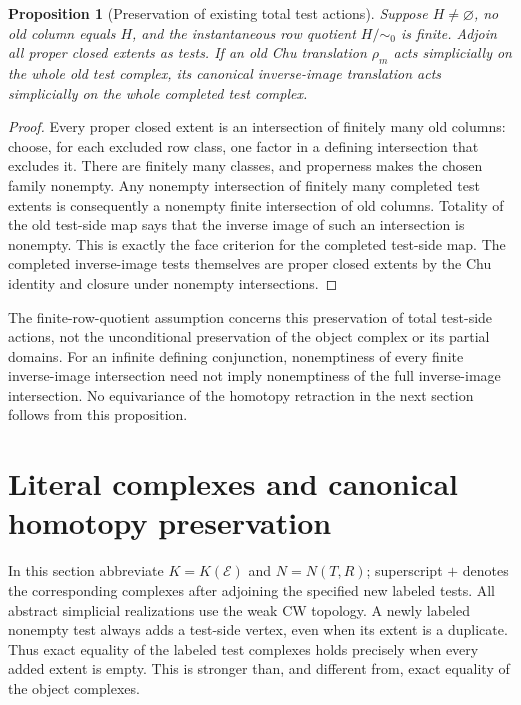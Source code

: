 \documentclass[11pt]{article}
\newtheorem{proposition}[theorem]{Proposition}
\theoremstyle{definition}
\begin{document}
\begin{proposition}[Preservation of existing total test actions]
Suppose $H\ne\varnothing$, no old column equals $H$, and the
instantaneous row quotient $H/{\sim_0}$ is finite. Adjoin all proper
closed extents as tests. If an old Chu translation $\rho_m$ acts
simplicially on the whole old test complex, its canonical inverse-image
translation acts simplicially on the whole completed test complex.
\end{proposition}
\begin{proof}
Every proper closed extent is an intersection of finitely many old
columns: choose, for each excluded row class, one factor in a defining
intersection that excludes it. There are finitely many classes, and
properness makes the chosen family nonempty. Any nonempty intersection
of finitely many completed test extents is consequently a nonempty
finite intersection of old columns. Totality of the old test-side map
says that the inverse image of such an intersection is nonempty. This
is exactly the face criterion for the completed test-side map.
The completed inverse-image tests themselves are proper closed extents
by the Chu identity and closure under nonempty intersections.
\end{proof}

The finite-row-quotient assumption concerns this preservation of total
test-side actions, not the unconditional preservation of the object
complex or its partial domains. For an infinite defining conjunction,
nonemptiness of every finite inverse-image intersection need not imply
nonemptiness of the full inverse-image intersection. No equivariance of
the homotopy retraction in the next section follows from this proposition.


\section{Literal complexes and canonical homotopy preservation}

In this section abbreviate $K=K(\mathcal E)$ and $N=N(T,R)$;
superscript $+$ denotes the corresponding complexes after adjoining the
specified new labeled tests. All abstract simplicial realizations use the
weak CW topology.
A newly labeled nonempty test always adds a test-side vertex, even when its
extent is a duplicate. Thus exact equality of the labeled test complexes
holds precisely when every added extent is empty. This is stronger than,
and different from, exact equality of the object complexes.
\end{document}
